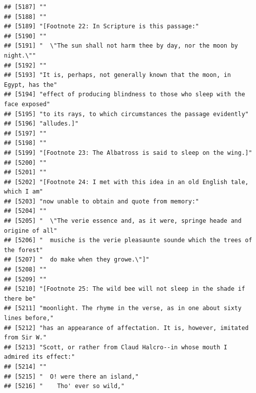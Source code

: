 \documentclass{article}\usepackage[]{graphicx}\usepackage[]{color}
\makeatletter
\newenvironment{kframe}{%
 \def\at@end@of@kframe{}%
 \ifinner\ifhmode%
  \def\at@end@of@kframe{\end{minipage}}%
  \begin{minipage}{\columnwidth}%
 \fi\fi%
 \def\FrameCommand##1{\hskip\@totalleftmargin \hskip-\fboxsep
 \colorbox{shadecolor}{##1}\hskip-\fboxsep
     \hskip-\linewidth \hskip-\@totalleftmargin \hskip\columnwidth}%
 \MakeFramed {\advance\hsize-\width
   \@totalleftmargin\z@ \linewidth\hsize
   \@setminipage}}%
 {\par\unskip\endMakeFramed%
 \at@end@of@kframe}
\newenvironment{knitrout}{}{} %
\makeatother
\begin{document}
\begin{knitrout}
\begin{kframe}
\begin{verbatim}
## [5187] ""                                                                            
## [5188] ""                                                                            
## [5189] "[Footnote 22: In Scripture is this passage:"                                 
## [5190] ""                                                                            
## [5191] "  \"The sun shall not harm thee by day, nor the moon by night.\""            
## [5192] ""                                                                            
## [5193] "It is, perhaps, not generally known that the moon, in Egypt, has the"        
## [5194] "effect of producing blindness to those who sleep with the face exposed"      
## [5195] "to its rays, to which circumstances the passage evidently"                   
## [5196] "alludes.]"                                                                   
## [5197] ""                                                                            
## [5198] ""                                                                            
## [5199] "[Footnote 23: The Albatross is said to sleep on the wing.]"                  
## [5200] ""                                                                            
## [5201] ""                                                                            
## [5202] "[Footnote 24: I met with this idea in an old English tale, which I am"       
## [5203] "now unable to obtain and quote from memory:"                                 
## [5204] ""                                                                            
## [5205] "  \"The verie essence and, as it were, springe heade and origine of all"     
## [5206] "  musiche is the verie pleasaunte sounde which the trees of the forest"      
## [5207] "  do make when they growe.\"]"                                               
## [5208] ""                                                                            
## [5209] ""                                                                            
## [5210] "[Footnote 25: The wild bee will not sleep in the shade if there be"          
## [5211] "moonlight. The rhyme in the verse, as in one about sixty lines before,"      
## [5212] "has an appearance of affectation. It is, however, imitated from Sir W."      
## [5213] "Scott, or rather from Claud Halcro--in whose mouth I admired its effect:"    
## [5214] ""                                                                            
## [5215] "  O! were there an island,"                                                  
## [5216] "    Tho' ever so wild,"                                                      

\end{verbatim}
\end{kframe}
\end{knitrout}
\end{document}
